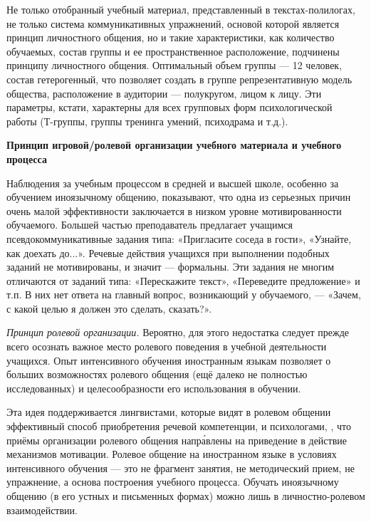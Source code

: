 Не только отобранный учебный материал, представленный в текстах-полилогах, не только система коммуникативных упражнений, основой которой является принцип личностного общения, но и такие характеристики, как количество обучаемых, состав группы и ее пространственное расположение, подчинены принципу личностного общения. Оптимальный объем группы --- 12 человек, состав гетерогенный, что позволяет создать в группе репрезентативную модель общества, расположение в аудитории --- полукругом, лицом к лицу. Эти параметры, кстати, характерны для всех групповых форм психологической работы (Т-группы, группы тренинга умений, психодрама и т.д.).

\textbf{Принцип игровой/ролевой организации учебного материала и учебного процесса}

Наблюдения за учебным процессом в средней и высшей школе, особенно за обучением иноязычному общению, показывают, что одна из серьезных причин очень малой эффективности заключается в низком уровне мотивированности обучаемого. Большей частью преподаватель предлагает учащимся псевдокоммуникативные задания типа: «Пригласите соседа в гости», «Узнайте, как доехать до...». Речевые действия учащихся при выполнении подобных заданий не мотивированы, и значит --- формальны. Эти задания не многим отличаются от заданий типа: «Перескажите текст», «Переведите предложение» и т.п. В них нет ответа на главный вопрос, возникающий у обучаемого, --- «Зачем, с какой целью я должен это сделать, сказать?».

\textit{Принцип ролевой организации.}
Вероятно, для  этого недостатка следует прежде всего осознать важное место ролевого поведения в учебной деятельности учащихся. Опыт интенсивного обучения иностранным языкам позволяет  о больших возможностях ролевого общения (ещё далеко не полностью исследованных) и целесообразности его использования в обучении.

Эта идея поддерживается лингвистами, которые видят в ролевом общении эффективный способ приобретения речевой компетенции, и психологами, , что приёмы организации ролевого общения напр\'{а}влены на приведение в действие механизмов мотивации. Ролевое общение на иностранном языке в условиях интенсивного обучения --- это не фрагмент занятия, не методический прием, не упражнение, а основа построения учебного процесса. Обучать иноязычному общению (в его устных и письменных формах) можно лишь в  личностно-ролевом взаимодействии.

